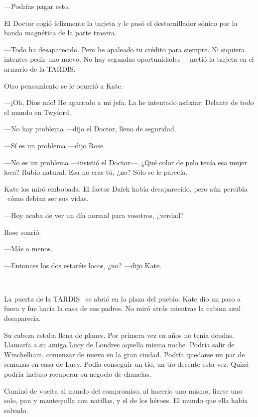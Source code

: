 ---Podrías pagar esto.

El Doctor cogió felizmente la tarjeta y le pasó el destornillador sónico
por la banda magnética de la parte trasera.

---Todo ha desaparecido. Pero he apaleado tu crédito para siempre. Ni
siquiera intentes pedir uno nuevo. No hay segundas oportunidades ---metió
la tarjeta en el armario de la TARDIS.

Otro pensamiento se le ocurrió a Kate.

---¡Oh, Dios mío! He agarrado a mi jefa. La he intentado asfixiar.
Delante de todo el mundo en Twyford.

---No hay problema ---dijo el Doctor, lleno de seguridad.

---Sí es un problema ---dijo Rose.

---No es un problema ---insistió el Doctor---. ¿Qué color de pelo tenía esa
mujer loca? Rubio natural. Esa no eras tú, ¿no? Sólo se le parecía.

Kate los miró embobada. El factor Dalek había desaparecido, pero aún
percibía ~cómo debían ser sus vidas.

---Hoy acaba de ver un día normal para vosotros, ¿verdad?

Rose sonrió.

---Más o menos.

---Entonces los dos estaréis locos, ¿no? ---dijo Kate.

~

La puerta de la TARDIS ~se abrió en la plaza del pueblo. Kate dio un
paso a fuera y fue hacia la casa de sus padres. No miró atrás mientras
la cabina azul desaparecía.

Su cabeza estaba llena de planes. Por primera vez en años no tenía
deudas. Llamaría a su amiga Lucy de Londres aquella misma noche. Podría
salir de Winchelham, comenzar de nuevo en la gran ciudad. Podría
quedarse un par de semanas en casa de Lucy. Podía conseguir un tío, un
tío decente esta vez. Quizá podría incluso recuperar su negocio de
chanclas.

Caminó de vuelta al mundo del compromiso, al hacerlo uno mismo, liarse
uno solo, pan y mantequilla con natillas, y el de los héroes. El mundo
que ella había salvado.